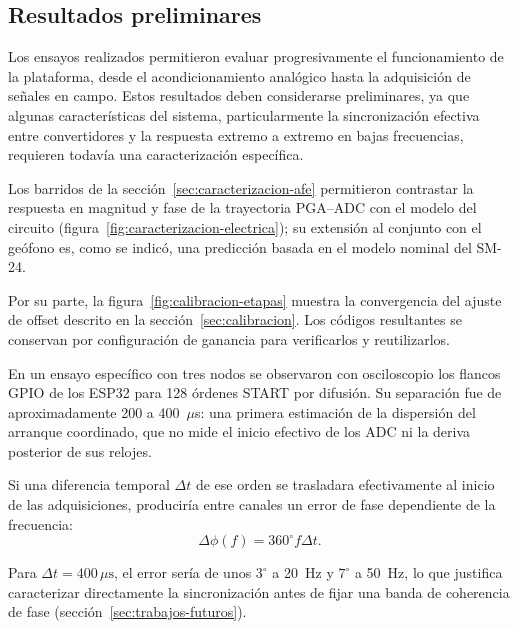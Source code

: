 \subsection{Resultados preliminares}
\label{sec:resultados}

Los ensayos realizados permitieron evaluar progresivamente el funcionamiento de la plataforma, desde el acondicionamiento analógico hasta la adquisición de señales en campo. Estos resultados deben considerarse preliminares, ya que algunas características del sistema, particularmente la sincronización efectiva entre convertidores y la respuesta extremo a extremo en bajas frecuencias, requieren todavía una caracterización específica.

Los barridos de la sección~\ref{sec:caracterizacion-afe} permitieron contrastar la respuesta en magnitud y fase de la trayectoria PGA--ADC con el modelo del circuito (figura~\ref{fig:caracterizacion-electrica}); su extensión al conjunto con el geófono es, como se indicó, una predicción basada en el modelo nominal del SM-24.

Por su parte, la figura~\ref{fig:calibracion-etapas} muestra la convergencia del ajuste de offset descrito en la sección~\ref{sec:calibracion}. Los códigos resultantes se conservan por configuración de ganancia para verificarlos y reutilizarlos.

En un ensayo específico con tres nodos se observaron con osciloscopio los flancos GPIO de los ESP32 para 128 órdenes START por difusión. Su separación fue de aproximadamente 200 a 400~$\mu$s: una primera estimación de la dispersión del arranque coordinado, que no mide el inicio efectivo de los ADC ni la deriva posterior de sus relojes.

Si una diferencia temporal \(\Delta t\) de ese orden se trasladara efectivamente al inicio de las adquisiciones, produciría entre canales un error de fase dependiente de la frecuencia:
\begin{equation}
	\Delta\phi(f)=360^\circ f\Delta t.
	\label{eq:error-fase}
\end{equation}

Para \(\Delta t=400\,\mu\text{s}\), el error sería de unos \(3^\circ\) a 20~Hz y \(7^\circ\) a 50~Hz, lo que justifica caracterizar directamente la sincronización antes de fijar una banda de coherencia de fase (sección~\ref{sec:trabajos-futuros}).

